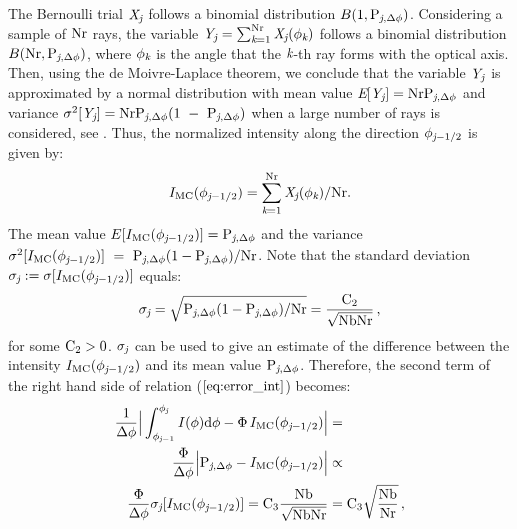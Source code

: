 The Bernoulli trial $ \textit{X}_{\textit{j}}$ follows a binomial distribution $B(1,\textrm{P}_{\textit{j}, \Delta\phi})$.
Considering a sample of $\textrm{Nr}$ rays, the variable $\textit{Y}_{\textit{j}} = \sum_{\textit{k}=1}^{\textrm{Nr}} \textit{X}_{\textit{j}}(\phi_{\textit{k}})$
follows a binomial distribution $B(\textrm{Nr}, \textrm{P}_{\textit{j},\Delta \phi})$, where $\phi_{\textit{k}}$ is the angle that the $\textit{k}$-th ray forms
 with the optical axis. Then, using the de Moivre-Laplace theorem, we conclude that the variable $\textit{Y}_{\textit{j}}$ is approximated by a normal distribution with mean value 
$\textit{E}[\textit{Y}_{\textit{j}}] = \textrm{Nr}\textrm{P}_{\textit{j}, \Delta\phi}$ and variance $\sigma^2[\textit{Y}_{\textit{j}}] = \textrm{Nr}\textrm{P}_{\textit{j}, \Delta\phi}(1~-~\textrm{P}_{\textit{j}, \Delta\phi})$ 
when a large number of rays is considered, see \cite{zolotarev1997modern, rubinstein2016simulation}.
Thus, the normalized intensity along the direction $\phi_{\textit{j}-1/2}$ is given by:
\begin{equation}I_{\textrm{MC}}(\phi_{\textit{j}-1/2}) = \sum_{\textit{k}=1}^{\textrm{Nr}}\textit{X}_{\textit{j}}(\phi_{\textit{k}})/\textrm{Nr}.\end{equation}
The mean value $E[I_{\textrm{MC}}(\phi_{\textit{j}-1/2})]=\textrm{P}_{\textit{j}, \Delta\phi}$
and the variance $\sigma^2[I_{\textrm{MC}}(\phi_{\textit{j}-1/2})] ~=~ \textrm{P}_{\textit{j}, \Delta\phi}(1-\textrm{P}_{\textit{j}, \Delta\phi})/\textrm{Nr}$.
Note that the standard deviation $\sigma_{\textit{j}}:=\sigma[I_{\textrm{MC}}(\phi_{\textit{j}-1/2})]$ equals:
\begin{equation}\label{sigma}
\sigma_{\textit{j}}= \sqrt{\textrm{P}_{\textit{j}, \Delta\phi}(1-\textrm{P}_{\textit{j}, \Delta\phi})/\textrm{Nr}}= \frac{\textrm{C}_2}{\sqrt{\textrm{Nb}\textrm{Nr}}}\,, \end{equation}
 for some $\textrm{C}_{2}>0$. $\sigma_{\textit{j}}$ can be used to give an estimate of the difference between the intensity $I_{\textrm{MC}}(\phi_{\textit{j}-1/2})$ and its mean value $\textrm{P}_{\textit{j}, \Delta\phi}$.
Therefore, the second term of the right hand side of relation ($\ref{eq:error_int}$) becomes:
\begin{equation}\begin{aligned}
\frac{1}{\Delta \phi}\Big|\int_{\phi_{\textit{j}-1}}^{\phi_{\textit{j}}} I(\phi)\textrm{d}\phi -
\Phi\, I_{\textrm{MC}}(\phi_{\textit{j}-1/2})\Big| &=  \\
\frac{\Phi}{\Delta \phi}\Big|\textrm{P}_{\textit{j}, \Delta\phi} -I_{\textrm{MC}}(\phi_{\textit{j}-1/2})\Big| &\propto  \\
  \frac{\Phi}{\Delta \phi}
\sigma_{\textit{j}}[I_{\textrm{MC}}(\phi_{\textit{j}-1/2})]=\textrm{C}_3\frac{\textrm{Nb}}{\sqrt{\textrm{Nb}\textrm{Nr}}} & = \textrm{C}_3\sqrt{\frac{\textrm{Nb}}{\textrm{Nr}}}\,,
\end{aligned}
\end{equation}
